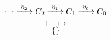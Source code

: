 \documentclass[12pt]{amsproc}
\begin{document}


$$ \cdots \xrightarrow{\,\,{\partial_2}\,\,} C_2 \xrightarrow{\,\,{\partial_1}\,\,} C_1 \xrightarrow{\,\,{\partial_0}\,\,} C_0 $$
$$ + - \mapsto $$
$$ \{ \} $$
\end{document}
